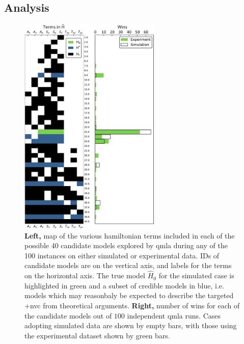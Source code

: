 \subsection{Analysis}\label{sec:exp_qmla_analysis}
\begin{figure}
    \begin{center}
        \includegraphics[width=0.6\textwidth]{experimental_study/figures/model_composition.pdf}
    \end{center}
    \caption[
        Models considered by QMLA for simulated/experimental nitrogen-vacancy centre data, and their win rates
    ]{
    \textbf{Left,} map of the various \gls{hamiltonian} terms included in each of the possible 40 candidate models explored by \gls{qmla}
    during any of the 100 \glspl{instance} on either simulated or experimental data.
    IDs of candidate models are on the vertical axis, and labels for the terms on the horizontal axis.
    The \gls{true model} $\hat{H}_0$ for the simulated case is highlighted in green and a subset of credible models in blue, 
    i.e. models which may reasonbaly be expected to describe the targeted \glsxtrlong+{nvc} from theoretical arguments.
    \textbf{Right,} number of wins for each of the candidate models out of $100$ independent \gls{qmla} \glspl{run}. 
    Cases adopting simulated data are shown by empty bars, with those using the experimental dataset shown by green bars.
    \figtableref
    } 
    \label{fig:nv_model_composition}
\end{figure}


